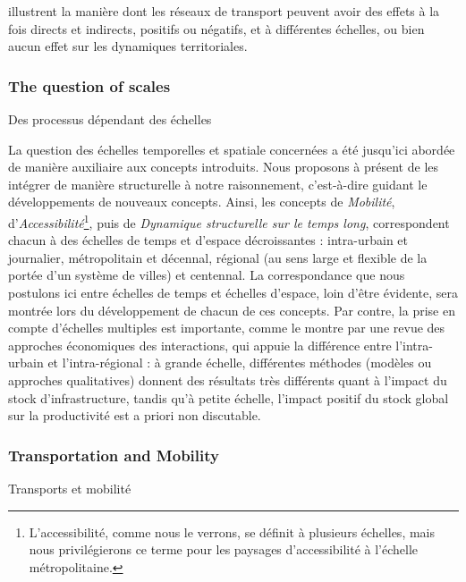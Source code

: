 {illustrent la manière dont les réseaux de transport peuvent avoir des effets à la fois directs et indirects, positifs ou négatifs, et à différentes échelles, ou bien aucun effet sur les dynamiques territoriales.
}





\subsubsection{The question of scales}{Des processus dépendant des échelles}

La question des échelles temporelles et spatiale concernées a été jusqu'ici abordée de manière auxiliaire aux concepts introduits. Nous proposons à présent de les intégrer de manière structurelle à notre raisonnement, c'est-à-dire guidant le développements de nouveaux concepts. Ainsi, les concepts de \emph{Mobilité}, d'\emph{Accessibilité}\footnote{L'accessibilité, comme nous le verrons, se définit à plusieurs échelles, mais nous privilégierons ce terme pour les paysages d'accessibilité à l'échelle métropolitaine.}, puis de \emph{Dynamique structurelle sur le temps long}, correspondent chacun à des échelles de temps et d'espace décroissantes : intra-urbain et journalier, métropolitain et décennal, régional (au sens large et flexible de la portée d'un système de villes) et centennal. La correspondance que nous postulons ici entre échelles de temps et échelles d'espace, loin d'être évidente, sera montrée lors du développement de chacun de ces concepts. Par contre, la prise en compte d'échelles multiples est importante, comme le montre \cite{RIETVELD1994329} par une revue des approches économiques des interactions, qui appuie la différence entre l'intra-urbain et l'intra-régional : à grande échelle, différentes méthodes (modèles ou approches qualitatives) donnent des résultats très différents quant à l'impact du stock d'infrastructure, tandis qu'à petite échelle, l'impact positif du stock global sur la productivité est a priori non discutable.




\subsubsection{Transportation and Mobility}{Transports et mobilité}


